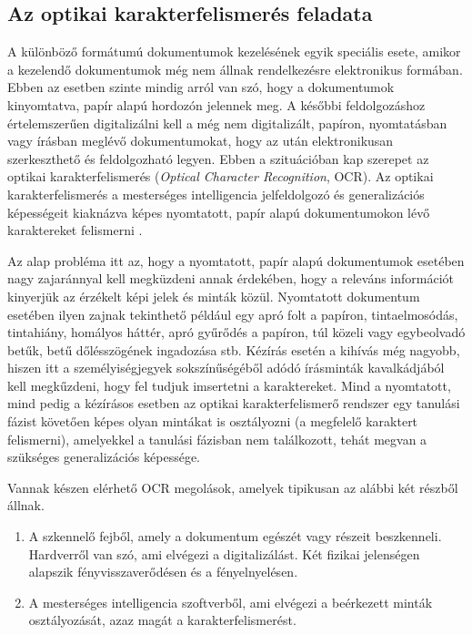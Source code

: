\subsection{Az optikai karakterfelismerés feladata}

A különböző formátumú dokumentumok kezelésének egyik speciális esete, amikor a kezelendő dokumentumok még nem állnak rendelkezésre elektronikus formában. Ebben az esetben szinte mindig arról van szó, hogy a dokumentumok kinyomtatva, papír alapú hordozón jelennek meg. A későbbi feldolgozáshoz értelemszerűen digitalizálni kell a még nem digitalizált, papíron, nyomtatásban vagy írásban meglévő dokumentumokat, hogy az után elektronikusan szerkeszthető és feldolgozható legyen. Ebben a szituációban kap szerepet az optikai karakterfelismerés (\textit{Optical Character Recognition}, OCR). Az optikai karakterfelismerés a mesterséges intelligencia jelfeldolgozó és generalizációs képességeit kiaknázva képes nyomtatott, papír alapú dokumentumokon lévő karaktereket felismerni \cite{liu2013online}.

Az alap probléma itt az, hogy a nyomtatott, papír alapú dokumentumok esetében nagy zajaránnyal kell megküzdeni annak érdekében, hogy a releváns információt kinyerjük az érzékelt képi jelek és minták közül. Nyomtatott dokumentum esetében ilyen zajnak tekinthető például egy apró folt a papíron, tintaelmosódás, tintahiány, homályos háttér, apró gyűrődés a papíron, túl közeli vagy egybeolvadó betűk, betű dőlésszögének ingadozása stb. Kézírás esetén a kihívás még nagyobb, hiszen itt a személyiségjegyek sokszínűségéből adódó írásminták kavalkádjából kell megkűzdeni, hogy fel tudjuk imsertetni a karaktereket. Mind a nyomtatott, mind pedig a kézírásos esetben az optikai karakterfelismerő rendszer egy tanulási fázist követően képes olyan mintákat is osztályozni (a megfelelő karaktert felismerni), amelyekkel a tanulási fázisban nem találkozott, tehát megvan a szükséges generalizációs képessége.

Vannak készen elérhető OCR megolások, amelyek tipikusan az alábbi két részből állnak.
\begin{enumerate}
\item A szkennelő fejből, amely a dokumentum egészét vagy részeit beszkenneli. Hardverről van szó, ami elvégezi a digitalizálást. Két fizikai jelenségen alapszik fényvisszaverődésen és a fényelnyelésen.
\item  A mesterséges intelligencia szoftverből, ami elvégezi a beérkezett minták osztályozását, azaz magát a karakterfelismerést.
\end{enumerate}

